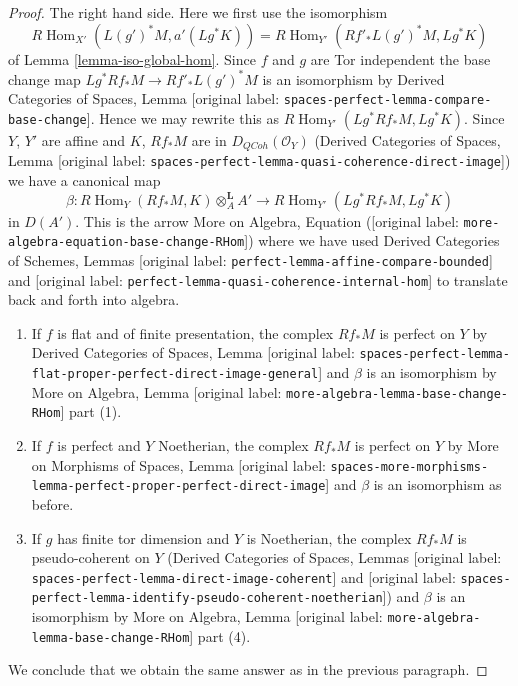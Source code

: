 \documentclass[10pt,a4paper]{article}
\theoremstyle{plain}
\theoremstyle{definition}
\theoremstyle{remark}
\numberwithin{equation}{subsection}
\def\Hom{\mathop{\mathrm{Hom}}\nolimits}
\def\QCoh{\mathit{QCoh}}
\begin{document}
\begin{proof}
\medskip\noindent
The right hand side. Here we first use the isomorphism
$$
R\Hom_{X'}(L(g')^*M, a'(Lg^*K)) = R\Hom_{Y'}(Rf'_*L(g')^*M, Lg^*K)
$$
of Lemma \ref{lemma-iso-global-hom}. Since $f$ and $g$ are
Tor independent the base change
map $Lg^*Rf_*M \to Rf'_*L(g')^*M$ is an isomorphism by
Derived Categories of Spaces, Lemma
\textnormal{[original label: \nolinkurl{spaces-perfect-lemma-compare-base-change}]}.
Hence we may rewrite this as $R\Hom_{Y'}(Lg^*Rf_*M, Lg^*K)$.
Since $Y$, $Y'$ are affine and $K$, $Rf_*M$ are in $D_\QCoh(\mathcal{O}_Y)$
(Derived Categories of Spaces, Lemma
\textnormal{[original label: \nolinkurl{spaces-perfect-lemma-quasi-coherence-direct-image}]})
we have a canonical map
$$
\beta :
R\Hom_Y(Rf_*M, K) \otimes^\mathbf{L}_A A'
\longrightarrow
R\Hom_{Y'}(Lg^*Rf_*M, Lg^*K)
$$
in $D(A')$. This is the arrow
More on Algebra, Equation (\textnormal{[original label: \nolinkurl{more-algebra-equation-base-change-RHom}]})
where we have used Derived Categories of Schemes, Lemmas
\textnormal{[original label: \nolinkurl{perfect-lemma-affine-compare-bounded}]} and
\textnormal{[original label: \nolinkurl{perfect-lemma-quasi-coherence-internal-hom}]}
to translate back and forth into algebra.
\begin{enumerate}
\item If $f$ is flat and of finite presentation, the complex $Rf_*M$
is perfect on $Y$ by Derived Categories of Spaces, Lemma
\textnormal{[original label: \nolinkurl{spaces-perfect-lemma-flat-proper-perfect-direct-image-general}]}
and $\beta$ is an isomorphism by
More on Algebra, Lemma \textnormal{[original label: \nolinkurl{more-algebra-lemma-base-change-RHom}]} part (1).
\item If $f$ is perfect and $Y$ Noetherian, the complex $Rf_*M$
is perfect on $Y$ by More on Morphisms of Spaces, Lemma
\textnormal{[original label: \nolinkurl{spaces-more-morphisms-lemma-perfect-proper-perfect-direct-image}]}
and $\beta$ is an isomorphism as before.
\item If $g$ has finite tor dimension and $Y$ is Noetherian,
the complex $Rf_*M$ is pseudo-coherent on $Y$
(Derived Categories of Spaces, Lemmas
\textnormal{[original label: \nolinkurl{spaces-perfect-lemma-direct-image-coherent}]} and
\textnormal{[original label: \nolinkurl{spaces-perfect-lemma-identify-pseudo-coherent-noetherian}]})
and $\beta$ is an isomorphism by
More on Algebra, Lemma \textnormal{[original label: \nolinkurl{more-algebra-lemma-base-change-RHom}]} part (4).
\end{enumerate}
We conclude that we obtain the same answer as in the previous paragraph.


\end{proof}
\end{document}
